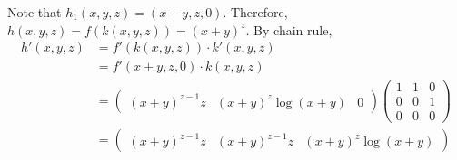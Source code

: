 \documentclass{exam}
\numberwithin{equation}{section}
\begin{document}
\begin{enumerate}[label=(\alph*)]
            Note that $h_1(x,y,z)=(x+y, z, 0)$. Therefore, 
            $h(x,y,z)=f(k(x,y,z))=(x+y)^z$. By chain rule,
            \begin{align*}
                h'(x,y,z)&=f'(k(x,y,z))\cdot k'(x,y,z)\\
                &=f'(x+y,z,0)\cdot k(x,y,z)\\
                &=\begin{pmatrix}
                    (x+y)^{z-1}z & (x+y)^z\log(x+y) & 0
                \end{pmatrix}\begin{pmatrix}
                    1 & 1 & 0\\
                0 & 0 & 1\\
                0 & 0 & 0
                \end{pmatrix}\\
                &=\begin{pmatrix}
                    (x+y)^{z-1}z &  (x+y)^{z-1}z & (x+y)^z\log(x+y)
                \end{pmatrix}
            \end{align*} 
    \end{enumerate}
\end{document}
